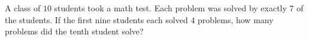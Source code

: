 A class of $10$ students took a math test. Each problem was solved by exactly $7$ of the students. If the first nine students each solved $4$ problems, how many problems did the tenth student solve?